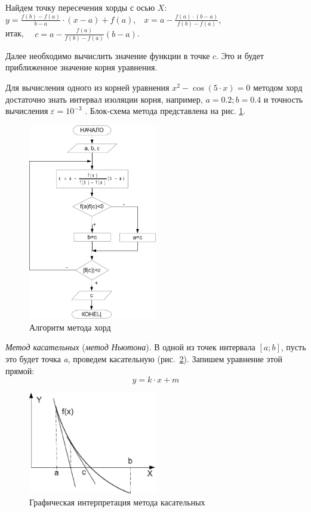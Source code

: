 Найдем точку пересечения хорды с осью $X$:\\
${y=\frac{f(b)-f(a)}{b-a}\cdot (x-a)+f(a)}$,\ \  ${x=a-\frac{f(a)\cdot (b-a)}{f(b)-f(a)}}$,\\ 
итак, \ \  ${c=a-\frac{f(a)}{f(b)-f(a)}(b-a)}$.

Далее необходимо вычислить значение функции в точке $c$. Это и будет приближенное значение корня
уравнения.

Для вычисления одного из корней уравнения  $x^2-\cos (5\cdot x)=0$  методом хорд достаточно знать интервал изоляции
корня, например,  $a=0.2;b=0.4$  и точность вычисления  $\varepsilon=10^{-3}$ . Блок-схема метода представлена на рис.
\ref{ch04:refDrawing5}. 

\begin{figure}[htb]
\begin{center}
\includegraphics[width=0.5\textwidth]{img/ris_4_6}
\caption{Алгоритм метода хорд}
\label{ch04:refDrawing5}
\end{center}
\end{figure}

\emph{Метод касательных} (\emph{метод Ньютона}). В одной из точек интервала  $[a;b]$, пусть
это будет точка \emph{a}, проведем касательную (рис.~\ref{ch04:refDrawing6}). Запишем уравнение этой прямой:
\begin{equation}\label{ch04:refDrawing6a}
y=k\cdot x+m
\end{equation}

\begin{figure}[htb]
\begin{center}
\includegraphics[width=0.5\textwidth]{img/ris_4_7}
\caption{Графическая интерпретация метода касательных}
\label{ch04:refDrawing6}
\end{center}
\end{figure}

